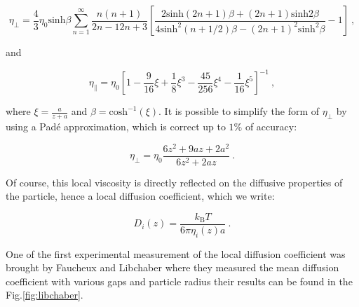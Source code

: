 \begin{equation}
	\eta_\bot = \frac{4}{3} \eta_0 \mathrm{sinh}\beta \sum _{n=1} ^{\infty} \frac{n(n+1)}{{2n-1}{2n+3}}
	\left[
	\frac
	{
		2\mathrm{sinh}(2n + 1)\beta + (2n +1)\mathrm{sinh}2\beta
	}
	{
		4\mathrm{sinh}^2(n + 1 /2)\beta  - (2n+1)^2 \mathrm{sinh}^2 \beta
	}
	-1
	\right] ~,
	\label{Eq:etaz}
\end{equation}

and 

\begin{equation}
	\eta_\parallel = \eta_0 
	\left[
	1 - \frac{9}{16} \xi + \frac{1}{8}\xi^3 - \frac{45}{256}\xi^4 - \frac{1}{16}\xi^5
	\right]^{-1}~,
	\label{Eq:etax}
\end{equation}

where $\xi = \frac{a}{z+a}$ and $\beta = \mathrm{cosh}^{-1}(\xi)$. It is possible to simplify the form of $\eta_\bot$ by using a Padé approximation, which is correct up to $1\%$ of accuracy:

\begin{equation}
	\eta_\bot = \eta_0 \frac{6z^2 + 9az + 2a^2}{6z^2 + 2az}~.
\end{equation}

Of course, this local viscosity is directly reflected on the diffusive properties of the particle, hence a local diffusion coefficient, which we write:

\begin{equation}
	D_i (z) = \frac{k_\mathrm{B} T}{6\pi\eta_i (z) a}~.
\end{equation}

One of the first experimental measurement of the local diffusion coefficient was brought by Faucheux and Libchaber \cite{faucheux_confined_1994} where they measured the mean diffusion coefficient with various gaps and particle radius their results can be found in the Fig.\ref{fig:libchaber}.

